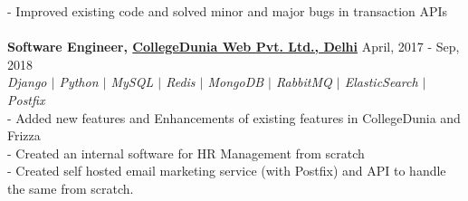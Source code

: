\documentclass[margin, centered]{res}
\begin{document}
\begin{resume}
- Improved existing code and solved minor and major bugs in transaction APIs \\
\\
\textbf{Software Engineer, \href{https://collegedunia.com}{CollegeDunia Web Pvt. Ltd., Delhi}} \hfill April, 2017 - Sep, 2018\\
\emph{\color{BlueViolet}Django $\vert$ Python $\vert$ MySQL $\vert$ Redis $\vert$ MongoDB $\vert$ RabbitMQ $\vert$ ElasticSearch $\vert$ Postfix } \\
- Added new features and Enhancements of existing features in CollegeDunia and Frizza\\
- Created an internal software for HR Management from scratch\\
- Created self hosted email marketing service (with Postfix) and API to handle the same from scratch.\\


\end{resume}
\end{document}
